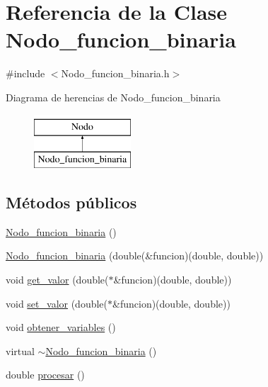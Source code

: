 \hypertarget{class_nodo__funcion__binaria}{}\section{Referencia de la Clase Nodo\+\_\+funcion\+\_\+binaria}
\label{class_nodo__funcion__binaria}


{\ttfamily \#include $<$Nodo\+\_\+funcion\+\_\+binaria.\+h$>$}

Diagrama de herencias de Nodo\+\_\+funcion\+\_\+binaria\begin{figure}[H]
\begin{center}
\leavevmode
\includegraphics[height=2.000000cm]{class_nodo__funcion__binaria}
\end{center}
\end{figure}
\subsection*{Métodos públicos}
\begin{DoxyCompactItemize}
\item 
\hyperlink{class_nodo__funcion__binaria_a2759485f81a0b5eecb4344e708a05e7f}{Nodo\+\_\+funcion\+\_\+binaria} ()
\item 
\hyperlink{class_nodo__funcion__binaria_a03cad31c73d5d42d60ba4252861ba56e}{Nodo\+\_\+funcion\+\_\+binaria} (double(\&funcion)(double, double))
\item 
void \hyperlink{class_nodo__funcion__binaria_ada34095260c6d6b9f8279edb6595db38}{get\+\_\+valor} (double($\ast$\&funcion)(double, double))
\item 
void \hyperlink{class_nodo__funcion__binaria_a07a097c0b959884106aed5b54d885c65}{set\+\_\+valor} (double($\ast$\&funcion)(double, double))
\item 
void \hyperlink{class_nodo__funcion__binaria_a25ca9388d98b6ddbc950c2b9a2894645}{obtener\+\_\+variables} ()
\item 
virtual \hyperlink{class_nodo__funcion__binaria_a88950c2b54d834ffd3a86f982e7bc3d7}{$\sim$\+Nodo\+\_\+funcion\+\_\+binaria} ()
\item 
double \hyperlink{class_nodo__funcion__binaria_a5637c538189912ddeb2b5f86a6855c0d}{procesar} ()
\end{DoxyCompactItemize}
